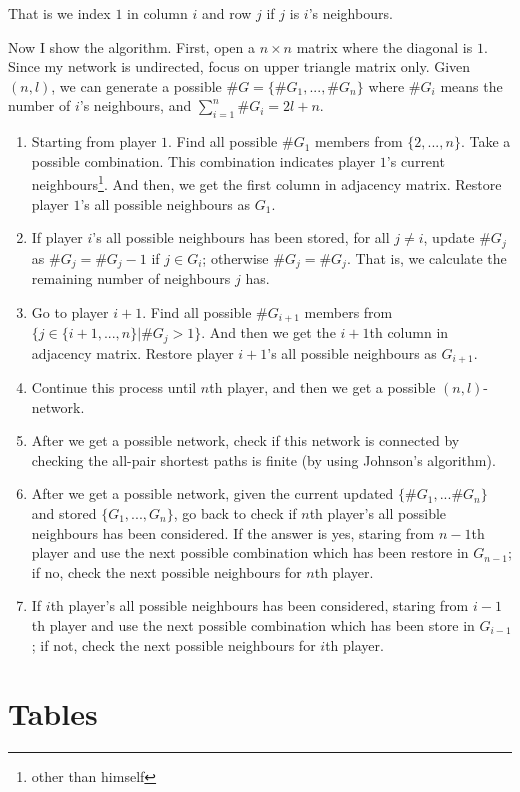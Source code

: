 \documentclass[12pt,letter]{article}
\theoremstyle{remark}
\theoremstyle{remark}
\theoremstyle{claim}
\begin{document}
That is we index $1$ in column $i$ and row $j$ if $j$ is $i$'s neighbours.

Now I show the algorithm. First, open a $n\times n$ matrix where the diagonal is $1$. Since my network is undirected, focus on upper triangle matrix only. Given $(n,l)$, we can generate a possible $\#G=\{\#G_1,...,\#G_n\}$ where $\#G_i$ means the number of $i$'s neighbours, and $\sum^n_{i=1}\#G_i=2l+n$.
\begin{enumerate}
\item Starting from player $1$. Find all possible $\#G_1$ members from $\{2,...,n\}$. Take a possible combination. This combination indicates player $1$'s current neighbours\footnote{other than himself}. And then, we get the first column in adjacency matrix. Restore player $1$'s all possible neighbours as $G_1$.
\item If player $i$'s all possible neighbours has been stored, for all $j\neq i$, update $\#G_j$ as $\#G_{j}=\#G_{j}- 1$ if $j\in G_{i}$; otherwise $\#G_{j}=\#G_{j}$. That is, we calculate the remaining number of neighbours $j$ has.
\item Go to player $i+1$. Find all possible $\# G_{i+1}$ members from $\{j\in \{i+1,...,n\}|\#G_j>1\}$. And then we get the $i+1$th column in adjacency matrix. Restore player $i+1$'s all possible neighbours as $G_{i+1}$.
\item Continue this process until $n$th player, and then we get a possible $(n,l)$-network.
\item After we get a possible network, check if this network is connected by checking the all-pair shortest paths is finite (by using Johnson's algorithm).
\item After we get a possible network, given the current updated $\{\#G_1,...\#G_n\}$ and stored $\{G_1,...,G_n\}$, go back to check if $n$th player's all possible neighbours has been considered. If the answer is yes, staring from $n-1$th player and use the next possible combination which has been restore in $G_{n-1}$; if no, check the next possible neighbours for $n$th player.
\item If $i$th player's all possible neighbours has been considered, staring from $i-1$th player and use the next possible combination which has been store in $G_{i-1}$; if not, check the next possible neighbours for $i$th player.
\end{enumerate}



\section{Tables}
\end{document}

